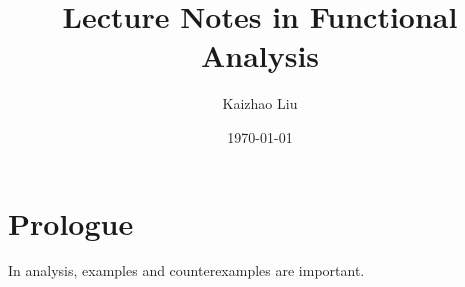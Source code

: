 \documentclass{book}
\title{Lecture Notes in Functional Analysis}
\author{Kaizhao Liu}
\date{\today}
\begin{document}
\maketitle
\tableofcontents

\section{Prologue}
In analysis, examples and counterexamples are important.









\end{document}
